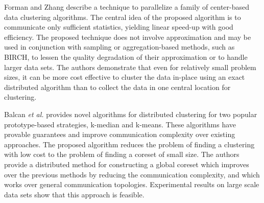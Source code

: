 \documentclass[smallextended]{svjour3}       %
\begin{document}
Forman and Zhang \cite{FZ00} describe a technique to parallelize a family of center-based data clustering algorithms. The central idea of the proposed algorithm is to communicate only sufficient statistics, yielding linear speed-up with good efficiency. The proposed technique does not involve approximation and may be used in conjunction with sampling or aggregation-based methods, such as BIRCH, to lessen the quality degradation of their approximation or to handle larger data sets. The authors demonstrate that even for relatively small problem sizes, it can be more cost effective to cluster the data in-place using an exact distributed algorithm than to collect the data in one central location for clustering.


Balcan \textit{et al.} \cite{BEL13} provides novel algorithms for distributed clustering for two popular prototype-based strategies, k-median and k-means. These algorithms have provable guarantees and improve communication complexity over existing approaches. The proposed algorithm reduces the problem of finding a clustering with low cost to the problem of finding a coreset of small size. The authors provide a distributed method for constructing a global coreset which improves over the previous methods by reducing the communication complexity, and which works over general communication topologies. Experimental results on large scale data sets show that this approach is feasible. 

\end{document}
